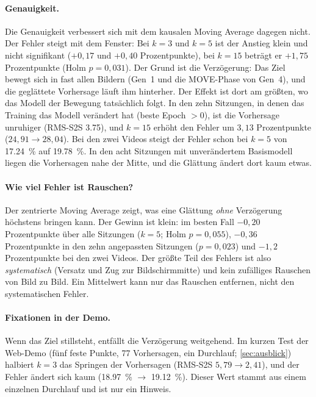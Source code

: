 \paragraph{Genauigkeit.} Die Genauigkeit verbessert sich mit dem kausalen
Moving Average dagegen nicht. Der Fehler steigt mit dem Fenster: Bei $k=3$ und
$k=5$ ist der Anstieg klein und nicht signifikant ($+0,17$ und $+0,40$
Prozentpunkte), bei $k=15$ beträgt er $+1,75$ Prozentpunkte (Holm $p=0,031$).
Der Grund ist die Verzögerung: Das Ziel bewegt sich in fast allen Bildern
(Gen~1 und die MOVE-Phase von Gen~4), und die geglättete Vorhersage läuft ihm
hinterher. Der Effekt ist dort am größten, wo das Modell der Bewegung
tatsächlich folgt. In den zehn Sitzungen, in denen das Training das Modell
verändert hat (beste Epoch $>0$), ist die Vorhersage unruhiger (RMS-S2S
\num{3,75}), und $k=15$ erhöht den Fehler um $3,13$ Prozentpunkte
($24,91 \rightarrow 28,04$). Bei den zwei Videos steigt der Fehler schon bei
$k=5$ von \SI{17,24}{\percent} auf \SI{19,78}{\percent}. In den acht Sitzungen
mit unverändertem Basismodell liegen die Vorhersagen nahe der Mitte, und die
Glättung ändert dort kaum etwas.

\paragraph{Wie viel Fehler ist Rauschen?} Der zentrierte Moving Average zeigt,
was eine Glättung \emph{ohne} Verzögerung höchstens bringen kann. Der Gewinn ist
klein: im besten Fall $-0,20$ Prozentpunkte über alle Sitzungen ($k=5$; Holm
$p=0,055$), $-0,36$ Prozentpunkte in den zehn angepassten Sitzungen
($p=0,023$) und $-1,2$ Prozentpunkte bei den zwei Videos. Der größte Teil des
Fehlers ist also \emph{systematisch} (Versatz und Zug zur Bildschirmmitte) und
kein zufälliges Rauschen von Bild zu Bild. Ein Mittelwert kann nur das Rauschen
entfernen, nicht den systematischen Fehler.

\paragraph{Fixationen in der Demo.} Wenn das Ziel stillsteht, entfällt die
Verzögerung weitgehend. Im kurzen Test der Web-Demo (fünf feste Punkte,
\num{77} Vorhersagen, ein Durchlauf; \cref{sec:ausblick}) halbiert $k=3$ das
Springen der Vorhersagen (RMS-S2S $5,79 \rightarrow 2,41$), und der Fehler
ändert sich kaum (\SI{18,97}{\percent} $\rightarrow$ \SI{19,12}{\percent}).
Dieser Wert stammt aus einem einzelnen Durchlauf und ist nur ein Hinweis.

